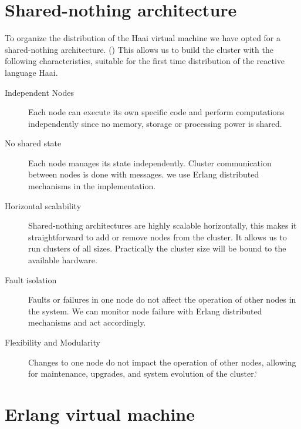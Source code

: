 \documentclass[a4paper]{book}
\begin{document}
\section{Shared-nothing architecture}
To organize the distribution of the Haai virtual machine we have opted for a shared-nothing architecture. (\cite{DBLP:journals/debu/Stonebraker86}) This allows us to build the cluster with the following characteristics, suitable for the first time distribution of the reactive language Haai.
\begin{description}
	\item[Independent Nodes] Each node can execute its own specific code and perform computations independently since no memory, storage or processing power is shared.
	\item[No shared state] Each node manages its state independently. Cluster communication between nodes is done with messages. we use Erlang distributed mechanisms in the implementation.
	\item[Horizontal scalability] Shared-nothing architectures are highly scalable horizontally, this makes it straightforward to add or remove nodes from the cluster. It allows us to run clusters of all sizes. Practically the cluster size will be bound to the available hardware.
	\item[Fault isolation] Faults or failures in one node do not affect the operation of other nodes in the system. We can monitor node failure with Erlang distributed mechanisms and act accordingly. 
	\item[Flexibility and Modularity] Changes to one node do not impact the operation of other nodes, allowing for maintenance, upgrades, and system evolution of the cluster.` 
\end{description}

\section{Erlang virtual machine}
\end{document}
